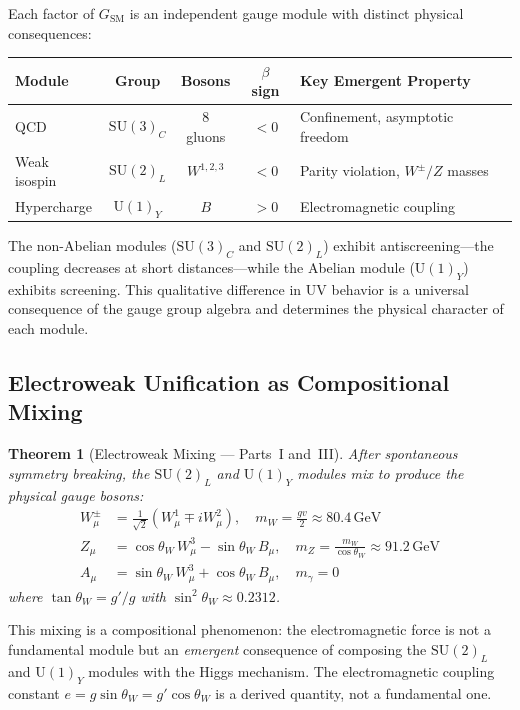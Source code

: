 \documentclass[12pt]{article}
\newtheorem{theorem}{Theorem}[section]
\theoremstyle{definition}
\theoremstyle{remark}
\newcommand{\GeV}{\,\mathrm{GeV}}
\newcommand{\su}[1]{\mathrm{SU}(#1)}
\newcommand{\uu}[1]{\mathrm{U}(#1)}
\begin{document}
Each factor of $G_{\mathrm{SM}}$ is an independent gauge module with distinct physical consequences:

\begin{center}
\renewcommand{\arraystretch}{1.3}
\begin{tabular}{lcccl}
\toprule
\textbf{Module} & \textbf{Group} & \textbf{Bosons} & $\beta$ \textbf{sign} & \textbf{Key Emergent Property} \\
\midrule
QCD & $\su{3}_C$ & 8 gluons & $<0$ & Confinement, asymptotic freedom \\
Weak isospin & $\su{2}_L$ & $W^{1,2,3}$ & $<0$ & Parity violation, $W^\pm/Z$ masses \\
Hypercharge & $\uu{1}_Y$ & $B$ & $>0$ & Electromagnetic coupling \\
\bottomrule
\end{tabular}
\end{center}

The non-Abelian modules ($\su{3}_C$ and $\su{2}_L$) exhibit antiscreening---the coupling decreases at short distances---while the Abelian module ($\uu{1}_Y$) exhibits screening. This qualitative difference in UV behavior is a universal consequence of the gauge group algebra and determines the physical character of each module.

\subsection{Electroweak Unification as Compositional Mixing}

\begin{theorem}[Electroweak Mixing --- Parts~I and~III]
\label{thm:ew-mixing}
After spontaneous symmetry breaking, the $\su{2}_L$ and $\uu{1}_Y$ modules mix to produce the physical gauge bosons:
\begin{align}
W^\pm_\mu &= \frac{1}{\sqrt{2}}(W^1_\mu \mp iW^2_\mu), \quad m_W = \frac{gv}{2} \approx 80.4\GeV \\
Z_\mu &= \cos\theta_W\, W^3_\mu - \sin\theta_W\, B_\mu, \quad m_Z = \frac{m_W}{\cos\theta_W} \approx 91.2\GeV \\
A_\mu &= \sin\theta_W\, W^3_\mu + \cos\theta_W\, B_\mu, \quad m_\gamma = 0
\end{align}
where $\tan\theta_W = g'/g$ with $\sin^2\theta_W \approx 0.2312$.
\end{theorem}

This mixing is a compositional phenomenon: the electromagnetic force is not a fundamental module but an \emph{emergent} consequence of composing the $\su{2}_L$ and $\uu{1}_Y$ modules with the Higgs mechanism. The electromagnetic coupling constant $e = g\sin\theta_W = g'\cos\theta_W$ is a derived quantity, not a fundamental one.
\end{document}

